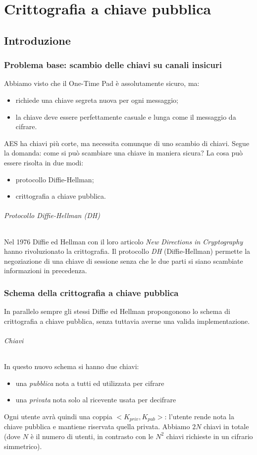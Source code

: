\part{Crittografia a chiave pubblica}
\chapter{Introduzione}
\section{Problema base: scambio delle chiavi su canali insicuri}
Abbiamo visto che il One-Time Pad è assolutamente sicuro, ma:
\begin{itemize}
	\item richiede una chiave segreta nuova per ogni messaggio;
	\item la chiave deve essere perfettamente casuale e lunga come il messaggio da cifrare.
\end{itemize}
AES ha chiavi più corte, ma necessita comunque di uno scambio di chiavi. Segue la domanda: come si può scambiare una chiave in maniera sicura? La cosa può essere risolta in due modi:
\begin{itemize}
	\item protocollo Diffie-Hellman;
	\item crittografia a chiave pubblica.
\end{itemize}
\paragraph{Protocollo Diffie-Hellman (DH)}
Nel 1976 Diffie ed Hellman con il loro articolo \emph{New Directions in Cryptography} hanno rivoluzionato la crittografia.
Il protocollo \emph{DH} (Diffie-Hellman) permette la negoziazione di una chiave di sessione senza che le due parti si siano scambiate informazioni in precedenza.
\section{Schema della crittografia a chiave pubblica}
In parallelo sempre gli stessi Diffie ed Hellman propongonono lo schema di crittografia a chiave pubblica, senza tuttavia averne una valida implementazione. 
\paragraph{Chiavi} In questo nuovo schema si hanno due chiavi:
\begin{itemize}
    \item una \emph{pubblica} nota a tutti ed utilizzata per cifrare
    \item una \emph{privata}  nota solo al ricevente usata per decifrare
\end{itemize}
Ogni utente avrà quindi una coppia $ <K_{priv}, K_{pub}>$: l'utente rende nota la chiave pubblica e mantiene riservata quella privata. Abbiamo $2N$ chiavi in totale (dove $N$ è il numero di utenti, in contrasto con le $N^2$ chiavi richieste in un cifrario simmetrico).

